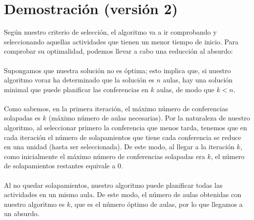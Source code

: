\documentclass{article}
\begin{document}
	\section{Demostración (versión 2)}
	Según nuestro criterio de selección, el algoritmo va a ir comprobando y seleccionando aquellas actividades que tienen un menor tiempo de inicio. Para comprobar su optimalidad, podemos llevar a cabo una reducción al absurdo: \\
	\\
	Supongamos que nuestra solución no es óptima; esto implica que, si nuestro algoritmo voraz ha determinado que la solución es $n$ aulas, hay una solución minimal que puede planificar las conferencias en $k$ aulas, de modo que $k<n$. \\
	\\
	Como sabemos, en la primera iteración, el máximo número de conferencias solapadas es $k$ (máximo número de aulas necesarias). Por la naturaleza de nuestro algoritmo, al seleccionar primero la conferencia que menos tarda, tenemos que en cada iteración el número de solapamientos que tiene cada conferencia se reduce en una unidad (hasta ser seleccionada). De este modo, al llegar a la iteración $k$, como inicialmente el máximo número de conferencias solapadas era $k$, el número de solapamientos restantes equivale a 0. \\
	\\
	Al no quedar solapamientos, nuestro algoritmo puede planificar todas las actividades en un mismo aula. De este modo, el número de aulas obtenidas con nuestro algoritmo es $k$, que es el número óptimo de aulas, por lo que llegamos a un absurdo.
	\\
	
\end{document}
